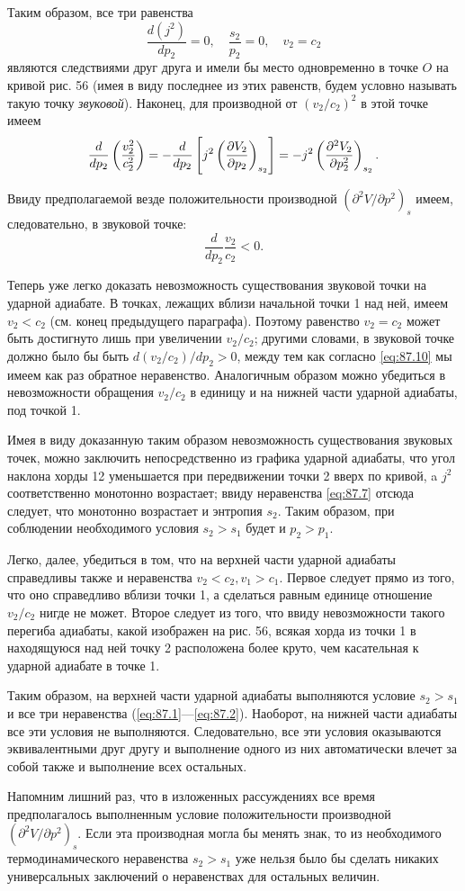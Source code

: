 Таким образом, все три равенства
\begin{equation}
	\label{eq:87.9}
	\frac{d(j^2)}{dp_2} = 0, \quad \frac{s_2}{p_2} = 0, \quad v_2 = c_2
\end{equation}
являются следствиями друг друга и имели бы место одновременно в точке $O$ на
кривой рис. 56 (имея в виду последнее из этих равенств, будем условно называть
такую точку \emph{звуковой}). Наконец, для производной от $(v_2/c_2)^2$ в этой
точке имеем
\[
	\frac{d}{dp_2}\left( \frac{v^2_2}{c^2_2} \right) =
	- \frac{d}{dp_2} \left\lbrack j^2 \left( \frac{\partial{V_2}}{\partial{p_2}} \right)_{s_2} \right\rbrack =
	- j^2  \left( \frac{\partial{^2 V_2}}{\partial{p^2_2}} \right)_{s_2}  .
\]

Ввиду предполагаемой везде положительности производной $(\partial^2 V/\partial
p^2)_s$ имеем, следовательно, в звуковой точке:
\begin{equation}
	\label{eq:87.10}
	\frac{d}{dp_2} \frac{v_2}{c_2} < 0.
\end{equation}

Теперь уже легко доказать невозможность существования звуковой точки на ударной
адиабате. В точках, лежащих вблизи начальной точки 1 над ней, имеем $v_2 < c_2$
(см. конец предыдущего параграфа). Поэтому равенство $v_2 = c_2$ может быть
достигнуто лишь при увеличении $v_2 / c_2$; другими словами, в звуковой точке
должно было бы быть $d(v_2/c_2)/dp_2 > 0$, между тем как согласно
\ref{eq:87.10} мы имеем как раз обратное неравенство. Аналогичным образом можно
убедиться в невозможности обращения $v_2/c_2$ в единицу и на нижней части
ударной адиабаты, под точкой 1.

Имея в виду доказанную таким образом невозможность существования звуковых
точек, можно заключить непосредственно из графика ударной адиабаты, что угол
наклона хорды 12 уменьшается при передвижении точки 2 вверх по кривой, a $j^2$
соответственно монотонно возрастает; ввиду неравенства \ref{eq:87.7} отсюда
следует, что монотонно возрастает и энтропия $s_2$. Таким образом, при
соблюдении необходимого условия $s_2>s_1$ будет и $p_2>p_1$.

Легко, далее, убедиться в том, что на верхней части ударной адиабаты
справедливы также и неравенства $v_2 < c_2, v_1>c_1$. Первое следует прямо из
того, что оно справедливо вблизи точки 1, а сделаться равным единице отношение
$v_2/c_2$ нигде не может. Второе следует из того, что ввиду невозможности
такого перегиба адиабаты, какой изображен на рис. 56, всякая хорда из точки 1 в
находящуюся над ней точку 2 расположена более круто, чем касательная к ударной
адиабате в точке 1.

Таким образом, на верхней части ударной адиабаты выполняются условие $s_2>s_1$
и все три неравенства (\ref{eq:87.1}—\ref{eq:87.2}). Наоборот, на нижней части
адиабаты все эти условия не выполняются. Следовательно, все эти условия
оказываются эквивалентными друг другу и выполнение одного из них автоматически
влечет за собой также и выполнение всех остальных.

Напомним лишний раз, что в изложенных рассуждениях все время предполагалось
выполненным условие положительности производной $(\partial^2 V/\partial
p^2)_s$. Если эта производная могла бы менять знак, то из необходимого
термодинамического неравенства $s_2>s_1$ уже нельзя было бы сделать никаких
универсальных заключений о неравенствах для остальных величин.
